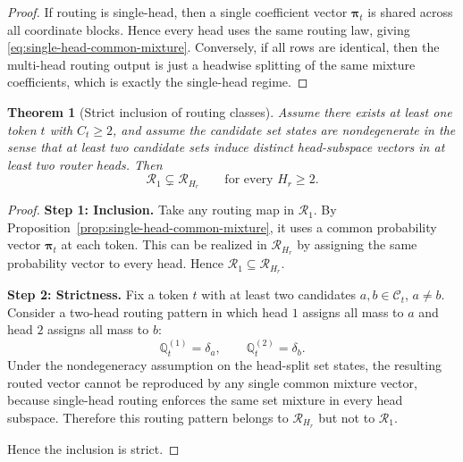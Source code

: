 \documentclass{article}
\theoremstyle{plain}
\newtheorem{theorem}{Theorem}[section]
\theoremstyle{definition}
\theoremstyle{remark}
\begin{document}
\begin{proof}
If routing is single-head, then a single coefficient vector $\boldsymbol{\pi}_{t}$ is shared across all coordinate blocks. Hence every head uses the same routing law, giving \eqref{eq:single-head-common-mixture}. Conversely, if all rows are identical, then the multi-head routing output is just a headwise splitting of the same mixture coefficients, which is exactly the single-head regime.
\end{proof}

\begin{theorem}[Strict inclusion of routing classes]
\label{thm:strict-routing-inclusion}
Assume there exists at least one token $t$ with $C_{t}\ge 2$, and assume the candidate set states are nondegenerate in the sense that at least two candidate sets induce distinct head-subspace vectors in at least two router heads. Then
\begin{equation}
\label{eq:strict-routing-inclusion}
\mathcal{R}_1 \subsetneq \mathcal{R}_{H_r}
\qquad \text{for every } H_r\ge 2.
\end{equation}
\end{theorem}

\begin{proof}
\textbf{Step 1: Inclusion.}
Take any routing map in $\mathcal{R}_1$. By Proposition~\ref{prop:single-head-common-mixture}, it uses a common probability vector $\boldsymbol{\pi}_{t}$ at each token. This can be realized in $\mathcal{R}_{H_r}$ by assigning the same probability vector to every head. Hence $\mathcal{R}_1 \subseteq \mathcal{R}_{H_r}$.

\textbf{Step 2: Strictness.}
Fix a token $t$ with at least two candidates $a,b\in \mathcal{C}_{t}$, $a\neq b$. Consider a two-head routing pattern in which head $1$ assigns all mass to $a$ and head $2$ assigns all mass to $b$:
\[
\mathbb Q^{(1)}_{t} = \delta_a,
\qquad
\mathbb Q^{(2)}_{t} = \delta_b.
\]
Under the nondegeneracy assumption on the head-split set states, the resulting routed vector cannot be reproduced by any single common mixture vector, because single-head routing enforces the same set mixture in every head subspace. Therefore this routing pattern belongs to $\mathcal{R}_{H_r}$ but not to $\mathcal{R}_1$.

Hence the inclusion is strict.
\end{proof}
\end{document}

